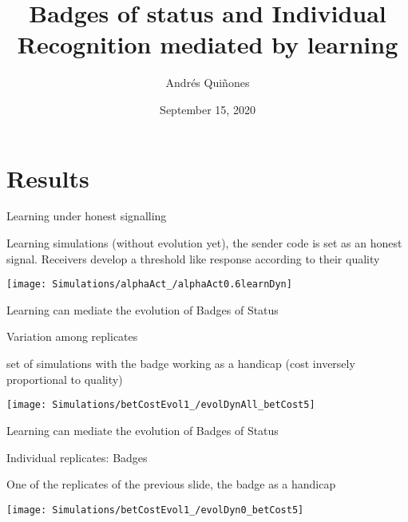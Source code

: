 \documentclass[
  ignorenonframetext,
]{beamer}
\title{Badges of status and Individual Recognition mediated by learning}
\author{Andrés Quiñones}
\date{September 15, 2020}
\begin{document}
\frame{\titlepage}

\begin{frame}

\end{frame}

\hypertarget{results}{%
\section{Results}\label{results}}

\begin{frame}{Learning under honest signalling}
\protect\hypertarget{learning-under-honest-signalling}{}

Learning simulations (without evolution yet), the sender code is set as
an honest signal. Receivers develop a threshold like response according
to their quality

\begin{center}\texttt{[image: Simulations/alphaAct\_/alphaAct0.6learnDyn]} \end{center}

\end{frame}

\begin{frame}{Learning can mediate the evolution of Badges of Status}
\protect\hypertarget{learning-can-mediate-the-evolution-of-badges-of-status}{}

\begin{block}{Variation among replicates}

\small

set of simulations with the badge working as a handicap (cost inversely
proportional to quality)

\begin{center}\texttt{[image: Simulations/betCostEvol1\_/evolDynAll\_betCost5]} \end{center}

\end{block}

\end{frame}

\begin{frame}{Learning can mediate the evolution of Badges of Status}
\protect\hypertarget{learning-can-mediate-the-evolution-of-badges-of-status-1}{}

\begin{block}{Individual replicates: Badges}

\small

One of the replicates of the previous slide, the badge as a handicap

\begin{center}\texttt{[image: Simulations/betCostEvol1\_/evolDyn0\_betCost5]} \end{center}

\end{block}

\end{frame}
\end{document}
